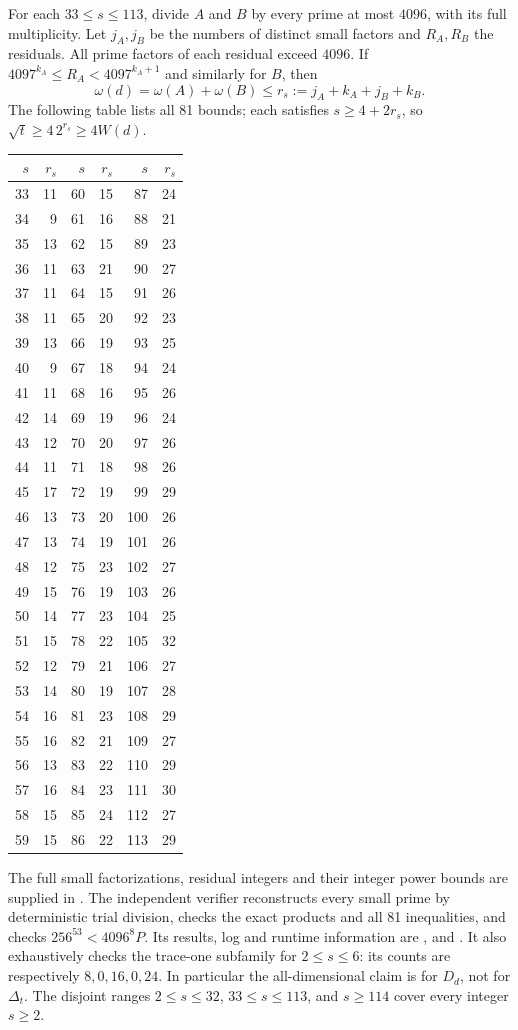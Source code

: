 \documentclass[11pt]{article}
\begin{document}
For each $33\le s\le113$, divide $A$ and $B$ by every prime at
most $4096$, with its full multiplicity. Let $j_A,j_B$ be the
numbers of distinct small factors and $R_A,R_B$ the residuals.
All prime factors of each residual exceed $4096$. If
$4097^{k_A}\le R_A<4097^{k_A+1}$ and similarly for $B$, then
\[
 \omega(d)=\omega(A)+\omega(B)
    \le r_s:=j_A+k_A+j_B+k_B.
\]
The following table lists all 81 bounds; each satisfies
$s\ge4+2r_s$, so $\sqrt t\ge4\,2^{r_s}\ge4W(d)$.
\begin{center}\small
\begin{tabular}{rr|rr|rr}
$s$&$r_s$&$s$&$r_s$&$s$&$r_s$\\\hline
33&11&60&15&87&24\\
34&9&61&16&88&21\\
35&13&62&15&89&23\\
36&11&63&21&90&27\\
37&11&64&15&91&26\\
38&11&65&20&92&23\\
39&13&66&19&93&25\\
40&9&67&18&94&24\\
41&11&68&16&95&26\\
42&14&69&19&96&24\\
43&12&70&20&97&26\\
44&11&71&18&98&26\\
45&17&72&19&99&29\\
46&13&73&20&100&26\\
47&13&74&19&101&26\\
48&12&75&23&102&27\\
49&15&76&19&103&26\\
50&14&77&23&104&25\\
51&15&78&22&105&32\\
52&12&79&21&106&27\\
53&14&80&19&107&28\\
54&16&81&23&108&29\\
55&16&82&21&109&27\\
56&13&83&22&110&29\\
57&16&84&23&111&30\\
58&15&85&24&112&27\\
59&15&86&22&113&29\\
\end{tabular}
\end{center}
The full small factorizations, residual integers and their integer
power bounds are supplied in
. The independent verifier
 reconstructs every small prime by
deterministic trial division, checks the exact products and all 81
inequalities, and checks $256^{53}<4096^8P$.
Its results, log and runtime information are
,
 and
.
It also exhaustively checks the trace-one subfamily for $2\le s\le6$:
its counts are respectively $8,0,16,0,24$. In particular the
all-dimensional claim is for $D_d$, not for $\Delta_t$.
The disjoint ranges $2\le s\le32$, $33\le s\le113$, and
$s\ge114$ cover every integer $s\ge2$.
\end{document}
